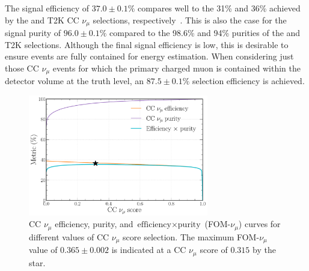 The signal efficiency of $37.0\pm0.1\%$ compares well to the 31\% and 36\% achieved by the \nova
and T2K CC $\nu_{\mu}$ selections, respectively~\cite{acero2019, abe2015}. This is also the case
for the signal purity of $96.0\pm0.1\%$ compared to the 98.6\% and 94\% purities of the \nova and
T2K selections. Although the final signal efficiency is low, this is desirable to ensure events
are fully contained for energy estimation. When considering just those CC $\nu_{\mu}$ events for
which the primary charged muon is contained within the detector volume at the truth level, an
$87.5\pm0.1\%$ selection efficiency is achieved.

\begin{figure} %
    \includegraphics[width=0.7\textwidth]{diagrams/7-results/final_numu_eff_curves.pdf}
    \caption[CC $\nu_{\mu}$ efficiency, purity, and $\text{efficiency}\times\text{purity}$ curves]
    {CC $\nu_{\mu}$ efficiency, purity, and $\text{efficiency}\times\text{purity}$
        (FOM-$\nu_{\mu}$) curves for different values of CC $\nu_{\mu}$ score selection. The
        maximum FOM-$\nu_{\mu}$ value of $0.365\pm0.002$ is indicated at a CC $\nu_{\mu}$ score of
        $0.315$ by the star.}
    \label{fig:final_numu_eff_curves}
\end{figure}

